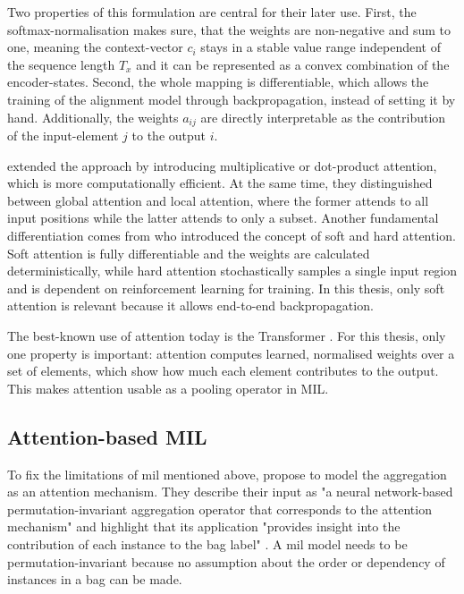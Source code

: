 \documentclass[12pt,parskip = half, DIV=classic,listof=totoc]{scrartcl}
\begin{document}
			Two properties of this formulation are central for their later use. First, the softmax-normalisation makes sure, that the weights 
			are non-negative and sum to one, meaning the context-vector $c_i$ stays in a stable value range independent of the sequence length $T_x$ and 
			it can be represented as a convex combination of the encoder-states. Second, the whole mapping is differentiable, which allows the training 
			of the alignment model through backpropagation, instead of setting it by hand. Additionally, the weights $a_{ij}$ are directly interpretable
			as the contribution of the input-element $j$ to the output $i$.

			\textcite{luongEffectiveApproachesAttentionbased2015} extended the approach by introducing multiplicative or dot-product attention, which is more computationally efficient.
			At the same time, they distinguished between global attention and local attention, where the former attends to all input positions while 
			the latter attends to only a subset.
			Another fundamental differentiation comes from \textcite{xuShowAttendTell2016} who introduced the concept of soft and hard attention. 
			Soft attention is fully differentiable and the weights are calculated deterministically, while hard attention stochastically samples a single input region and is 
			dependent on reinforcement learning for training. In this thesis, only soft attention is relevant because it allows end-to-end backpropagation.

			The best-known use of attention today is the Transformer \cite{vaswaniAttentionAllYou2017}. For this thesis, only one property is important: 
			attention computes learned, normalised weights over a set of elements, which show how much each element contributes to the output. 
			This makes attention usable as a pooling operator in MIL.

		\subsection{Attention-based MIL}\label{sec:attmil}
			To fix the limitations of \ac{mil} mentioned above, \textcite{ilseAttentionbasedDeepMultiple2018} propose to model the aggregation as an attention 
			mechanism. They describe their input as "a neural network-based permutation-invariant aggregation operator that corresponds to the attention mechanism" 
			and highlight that its application "provides insight into the contribution of each instance to the bag label" \cite{ilseAttentionbasedDeepMultiple2018}. 
			A \ac{mil} model needs to be permutation-invariant because no assumption about the order or dependency of instances in a bag can 
			be made. 
\end{document}
